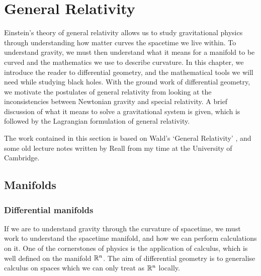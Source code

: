 \chapter{General Relativity}
\label{ch:diff}

Einstein's theory of general relativity allows us to study gravitational physics through understanding how matter curves the spacetime we live within. To understand gravity, we must then understand what it means for a manifold to be curved and the mathematics we use to describe curvature. In this chapter, we introduce the reader to differential geometry, and the mathematical tools we will need while studying black holes. With the ground work of differential geometry, we motivate the postulates of general relativity from looking at the inconsistencies between Newtonian gravity and special relativity. A brief discussion of what it means to solve a gravitational system is given, which is followed by the Lagrangian formulation of general relativity. 

The work contained in this section is based on Wald's `General Relativity' \cite{Wald:106274}, and some old lecture notes written by Reall \cite{Reall:2014gr, Reall:2014bh} from my time at the University of Cambridge. 

\section{Manifolds}
\label{sec:manifolds}

\subsection{Differential manifolds}

If we are to understand gravity through the curvature of spacetime, we must work to understand the spacetime manifold, and how we can perform calculations on it. One of the cornerstones of physics is the application of calculus, which is well defined on the manifold ${\mathbb{R}}^n$. The aim of differential geometry is to generalise calculus on spaces which we can only treat as ${\mathbb{R}}^n$ locally.

